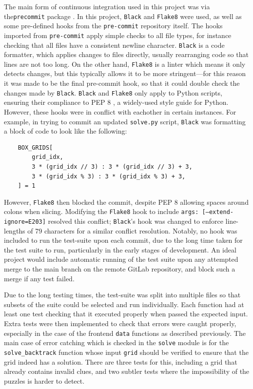\documentclass[12pt]{article}
\begin{document}
The main form of continuous integration used in this project was via the\texttt{pre\-commit} package \cite{precommit}.
In this project, \texttt{Black} \cite{black} and \texttt{Flake8} \cite{flake8} were used, as well as some pre-defined hooks from the \texttt{pre-commit} repository itself.
The hooks imported from \texttt{pre-commit} apply simple checks to all file types, for instance checking that all files have a consistent newline character.
\texttt{Black} is a code formatter, which applies changes to files directly, usually rearranging code so that lines are not too long.
On the other hand, \texttt{Flake8} is a linter which means it only detects changes, but this typically allows it to be more stringent---for this reason it was made to be the final pre-commit hook, so that it could double check the changes made by \texttt{Black}.
\texttt{Black} and \texttt{Flake8} only apply to Python scripts, ensuring their compliance to PEP 8 \cite{pep8}, a widely-used style guide for Python.
However, these hooks were in conflict with eachother in certain instances.
For example, in trying to commit an updated \texttt{solve.py} script, \texttt{Black} was formatting a block of code to look like the following:
\begin{lstlisting}
    BOX_GRIDS[
        grid_idx,
        3 * (grid_idx // 3) : 3 * (grid_idx // 3) + 3,
        3 * (grid_idx % 3) : 3 * (grid_idx % 3) + 3,
    ] = 1
\end{lstlisting}
However, \texttt{Flake8} then blocked the commit, despite PEP 8 allowing spaces around colons when slicing\cite{wspace}.
Modifying the \texttt{Flake8} hook to include \texttt{args: [--extend-ignore=E203]} resolved this conflict; \texttt{Black}'s hook was changed to enforce line-lengths of 79 characters for a similar conflict resolution.
Notably, no hook was included to run the test-suite upon each commit, due to the long time taken for the test suite to run, particularly in the early stages of development.
An ideal project would include automatic running of the test suite upon any attempted merge to the main branch on the remote GitLab repository, and block such a merge if any test failed.

Due to the long testing times, the test-suite was split into multiple files so that subsets of the suite could be selected and run individually.
Each function had at least one test checking that it executed properly when passed the expected input.
Extra tests were then implemented to check that errors were caught properly, especially in the case of the frontend \texttt{data} functions as described previously.
The main case of error catching which is checked in the \texttt{solve} module is for the \texttt{solve\_backtrack} function whose input \texttt{grid} should be verified to ensure that the grid indeed has a solution.
There are three tests for this, including a grid that already contains invalid clues, and two subtler tests where the impossibility of the puzzles is harder to detect.
\end{document}
